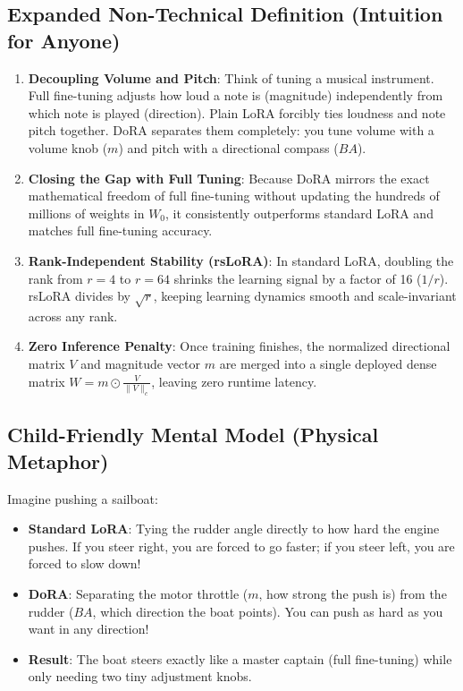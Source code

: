 \documentclass[11pt,a4paper]{article}
\theoremstyle{definition}
\begin{document}
\subsection{Expanded Non-Technical Definition (Intuition for Anyone)}
\begin{enumerate}
    \item \textbf{Decoupling Volume and Pitch}: Think of tuning a musical instrument. Full fine-tuning adjusts how loud a note is (magnitude) independently from which note is played (direction). Plain LoRA forcibly ties loudness and note pitch together. DoRA separates them completely: you tune volume with a volume knob ($m$) and pitch with a directional compass ($BA$).
    \item \textbf{Closing the Gap with Full Tuning}: Because DoRA mirrors the exact mathematical freedom of full fine-tuning without updating the hundreds of millions of weights in $W_0$, it consistently outperforms standard LoRA and matches full fine-tuning accuracy.
    \item \textbf{Rank-Independent Stability (rsLoRA)}: In standard LoRA, doubling the rank from $r=4$ to $r=64$ shrinks the learning signal by a factor of 16 ($1/r$). rsLoRA divides by $\sqrt{r}$, keeping learning dynamics smooth and scale-invariant across any rank.
    \item \textbf{Zero Inference Penalty}: Once training finishes, the normalized directional matrix $V$ and magnitude vector $m$ are merged into a single deployed dense matrix $W = m \odot \frac{V}{\|V\|_c}$, leaving zero runtime latency.
\end{enumerate}

\subsection{Child-Friendly Mental Model (Physical Metaphor)}
Imagine pushing a sailboat:
\begin{itemize}
    \item \textbf{Standard LoRA}: Tying the rudder angle directly to how hard the engine pushes. If you steer right, you are forced to go faster; if you steer left, you are forced to slow down!
    \item \textbf{DoRA}: Separating the motor throttle ($m$, how strong the push is) from the rudder ($BA$, which direction the boat points). You can push as hard as you want in any direction!
    \item \textbf{Result}: The boat steers exactly like a master captain (full fine-tuning) while only needing two tiny adjustment knobs.
\end{itemize}
\end{document}
